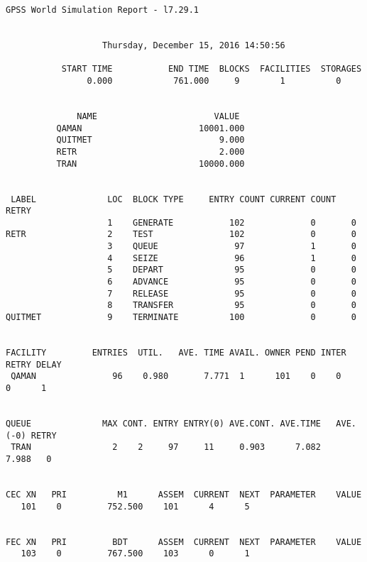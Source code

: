 \begin{lstlisting}[caption={Отчет}]
              GPSS World Simulation Report - l7.29.1


                   Thursday, December 15, 2016 14:50:56  

           START TIME           END TIME  BLOCKS  FACILITIES  STORAGES
                0.000            761.000     9        1          0


              NAME                       VALUE  
          QAMAN                       10001.000
          QUITMET                         9.000
          RETR                            2.000
          TRAN                        10000.000


 LABEL              LOC  BLOCK TYPE     ENTRY COUNT CURRENT COUNT RETRY
                    1    GENERATE           102             0       0
RETR                2    TEST               102             0       0
                    3    QUEUE               97             1       0
                    4    SEIZE               96             1       0
                    5    DEPART              95             0       0
                    6    ADVANCE             95             0       0
                    7    RELEASE             95             0       0
                    8    TRANSFER            95             0       0
QUITMET             9    TERMINATE          100             0       0


FACILITY         ENTRIES  UTIL.   AVE. TIME AVAIL. OWNER PEND INTER RETRY DELAY
 QAMAN               96    0.980       7.771  1      101    0    0     0      1


QUEUE              MAX CONT. ENTRY ENTRY(0) AVE.CONT. AVE.TIME   AVE.(-0) RETRY
 TRAN                2    2     97     11     0.903      7.082      7.988   0


CEC XN   PRI          M1      ASSEM  CURRENT  NEXT  PARAMETER    VALUE
   101    0         752.500    101      4      5


FEC XN   PRI         BDT      ASSEM  CURRENT  NEXT  PARAMETER    VALUE
   103    0         767.500    103      0      1
\end{lstlisting}